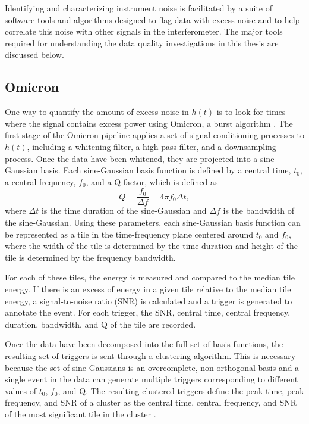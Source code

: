 Identifying and characterizing instrument noise is facilitated by a 
suite of software tools and algorithms designed to flag data with 
excess noise and to help correlate this noise with other signals in the 
interferometer. The major tools required for understanding the data 
quality investigations in this thesis are discussed below. 

\subsection{Omicron}

One way to quantify the amount of excess noise in $h(t)$ is to look 
for times where the signal contains excess power using 
Omicron, a burst algorithm \cite{Robinet:2015om}. 
The first stage of the Omicron pipeline applies a set of signal conditioning 
processes to $h(t)$, including a whitening filter, a high pass filter, and a downsampling 
process. Once the data have been whitened, they are projected into 
a sine-Gaussian basis. Each sine-Gaussian basis function is defined 
by a central time, $t_0$, a central frequency, $f_0$, and a Q-factor, 
which is defined as \cite{McIverThesis}  
\begin{equation}
Q = \frac{f_0}{\Delta f} = 4\pi f_0 \Delta t,
\end{equation} 
where $\Delta t$ is the time duration of the sine-Gaussian and 
$\Delta f$ is the bandwidth of the sine-Gaussian. Using these parameters, 
each sine-Gaussian basis function can be represented as a tile in the 
time-frequency plane centered around $t_0$ and $f_0$, where the width of 
the tile is determined by the time duration 
and height of the tile is determined by the frequency bandwidth. 

For each 
of these tiles, the energy is measured and compared to the median tile 
energy. If there is an excess of energy in a given tile relative to the 
median tile energy, a signal-to-noise ratio (SNR) is calculated and a trigger 
is generated to annotate the event. For each trigger, the SNR, central time, 
central frequency, duration, bandwidth, and Q of the tile are recorded. 

Once the data have been decomposed into the full set of basis functions, the 
resulting set of triggers is sent through a clustering algorithm. This is 
necessary because the set of sine-Gaussians is an overcomplete, 
non-orthogonal basis and a single event in the data can generate multiple 
triggers corresponding to different values of $t_0$, $f_0$, and Q. The 
resulting clustered triggers define the peak time, peak frequency, and 
SNR of a cluster as the central time, central frequency, and SNR of the 
most significant tile in the cluster \cite{McIverThesis}. 

